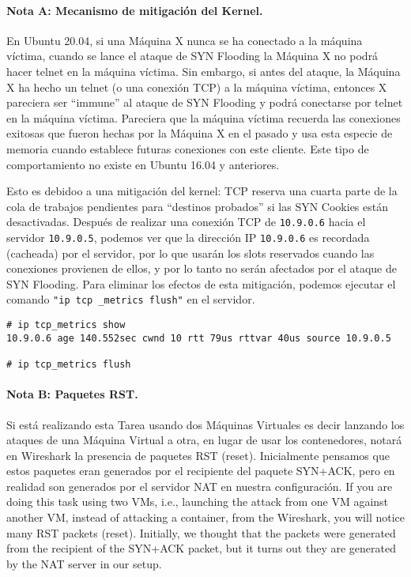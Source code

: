 \paragraph{Nota A: Mecanismo de mitigación del Kernel.} 
En Ubuntu 20.04, si una Máquina X nunca se ha conectado a la máquina víctima, cuando se lance el ataque de SYN Flooding la Máquina X no podrá hacer telnet en la máquina víctima. Sin embargo, si antes del ataque, la Máquina X ha hecho un telnet (o una conexión TCP) a la máquina víctima, entonces X pareciera ser ``immune'' al ataque de SYN Flooding y podrá conectarse por telnet en la máquina víctima. Pareciera que la máquina víctima recuerda las conexiones exitosas que fueron hechas por la Máquina X en el pasado y usa esta especie de memoria cuando establece futuras conexiones con este cliente. Este tipo de comportamiento no existe en Ubuntu 16.04 y anteriores.

Esto es debidoo a una mitigación del kernel:
TCP reserva una cuarta parte de la cola de trabajos pendientes para ``destinos probados'' si las SYN Cookies están desactivadas. Después de realizar una conexión TCP de \texttt{10.9.0.6} hacia el servidor \texttt{10.9.0.5}, podemos ver que la dirección IP \texttt{10.9.0.6} es recordada (cacheada) por el servidor, por lo que usarán los slots reservados cuando las conexiones provienen de ellos, y por lo tanto no serán afectados por el ataque de SYN Flooding.
Para eliminar los efectos de esta mitigación, podemos ejecutar el comando \texttt{"ip tcp\ _metrics flush"} en el servidor.

\begin{lstlisting}
# ip tcp_metrics show
10.9.0.6 age 140.552sec cwnd 10 rtt 79us rttvar 40us source 10.9.0.5

# ip tcp_metrics flush
\end{lstlisting}


\paragraph{Nota B: Paquetes RST.} 
Si está realizando esta Tarea usando dos Máquinas Virtuales es decir lanzando los ataques de una Máquina Virtual a otra, en lugar de usar los contenedores, notará en Wireshark la presencia de paquetes RST (reset). Inicialmente pensamos que estos paquetes eran generados por el recipiente del paquete SYN+ACK, pero en realidad son generados por el servidor NAT en nuestra configuración.
If you are doing this task using two VMs, i.e., launching the attack from one VM
against another VM, instead of attacking a container, from the Wireshark,
you will notice many RST packets (reset). Initially, we thought that 
the packets were generated from the recipient of the SYN+ACK packet, 
but it turns out they are generated by the 
NAT server in our setup. 

